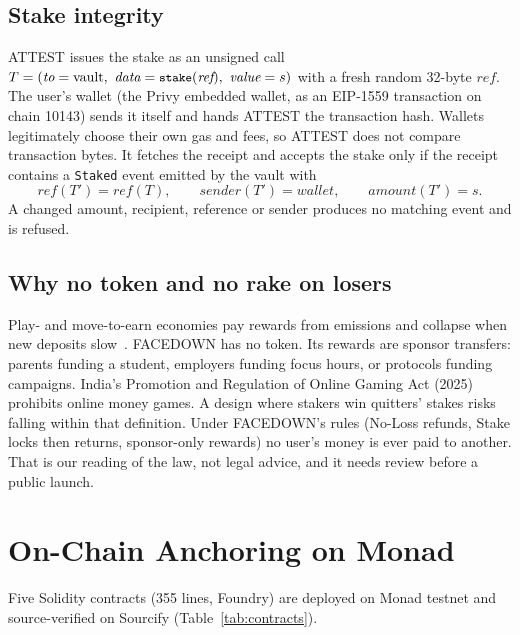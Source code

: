 \documentclass[10pt]{article}
\newcommand{\code}[1]{\texttt{\small #1}}
\begin{document}
\subsection{Stake integrity}
ATTEST issues the stake as an unsigned call $T=(\textit{to}=\text{vault},\ \textit{data}=\code{stake}(\textit{ref}),\
\textit{value}=s)$ with a fresh random 32-byte $\textit{ref}$. The user's wallet (the Privy embedded wallet, as an
EIP-1559 transaction on chain 10143) sends it itself and hands ATTEST the transaction hash. Wallets legitimately choose
their own gas and fees, so ATTEST does not compare transaction bytes. It fetches the receipt and accepts the stake only if
the receipt contains a \code{Staked} event emitted by the vault with
\begin{equation}
\textit{ref}(T')=\textit{ref}(T),\qquad \textit{sender}(T')=\textit{wallet},\qquad \textit{amount}(T')=s .
\end{equation}
A changed amount, recipient, reference or sender produces no matching event and is refused.

\subsection{Why no token and no rake on losers}
Play- and move-to-earn economies pay rewards from emissions and collapse when new deposits slow~\cite{gao2026}.
FACEDOWN has no token. Its rewards are sponsor transfers: parents funding a student, employers funding focus hours, or
protocols funding campaigns. India's Promotion and Regulation of Online Gaming Act (2025) prohibits online money games.
A design where stakers win quitters' stakes risks falling within that definition. Under FACEDOWN's rules (No-Loss
refunds, Stake locks then returns, sponsor-only rewards) no user's money is ever paid to another. That is our reading of
the law, not legal advice, and it needs review before a public launch.

\section{On-Chain Anchoring on Monad}\label{sec:chain}

Five Solidity contracts (355 lines, Foundry) are deployed on Monad testnet and source-verified on Sourcify
(Table~\ref{tab:contracts}).
\end{document}
